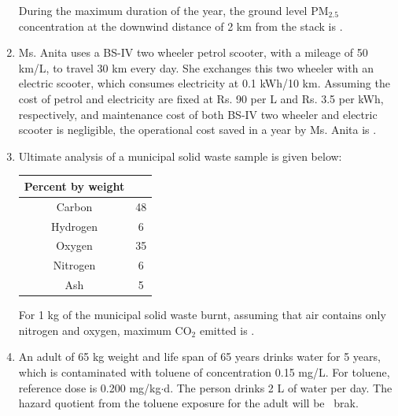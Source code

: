 \documentclass[journal,12pt,onecolumn]{IEEEtran}
\theoremstyle{remark}
\begin{document}
\begin{enumerate}
During the maximum duration of the year, the ground level PM$_{2.5}$ concentration at the downwind distance of 2 km  from the stack is \underline{\hspace{2cm}} .  
\hfill{}

\newpage

\item Ms. Anita uses a BS-IV two wheeler petrol scooter, with a mileage of 50 km/L, to travel 30 km every day. She exchanges this two wheeler with an electric scooter, which consumes electricity at 0.1 kWh/10 km. Assuming the cost of petrol and electricity are fixed at Rs. 90 per L and Rs. 3.5 per kWh, respectively, and maintenance cost of both BS-IV two wheeler and electric scooter is negligible, the operational cost saved in a year by Ms. Anita is \underline{\hspace{2cm}} .  
\hfill{}

\item Ultimate analysis of a municipal solid waste sample is given below:

\begin{center}
\begin{tabular}{|c|c|}
\hline
\textbf{Percent by weight} & \\ \hline
Carbon & 48 \\
Hydrogen & 6 \\
Oxygen & 35 \\
Nitrogen & 6 \\
Ash & 5 \\ \hline
\end{tabular}
\end{center}

For 1 kg of the municipal solid waste burnt, assuming that air contains only nitrogen and oxygen, maximum CO$_2$ emitted is \underline{\hspace{2cm}} .  
\hfill{}

\item An adult of 65 kg weight and life span of 65 years drinks water for 5 years, which is contaminated with toluene of concentration 0.15 mg/L. For toluene, reference dose is 0.200 mg/kg$\cdot$d. The person drinks 2 L of water per day. The hazard quotient from the toluene exposure for the adult will be \underline{\hspace{2cm}} \ brak{}.  
\hfill{}


\end{enumerate}
\end{document}
